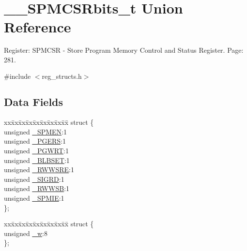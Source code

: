 \hypertarget{union_____s_p_m_c_s_rbits__t}{\section{\+\_\+\+\_\+\+S\+P\+M\+C\+S\+Rbits\+\_\+t Union Reference}
\label{union_____s_p_m_c_s_rbits__t}
}


Register\+: S\+P\+M\+C\+S\+R -\/ Store Program Memory Control and Status Register. Page\+: 281.  




{\ttfamily \#include $<$reg\+\_\+structs.\+h$>$}

\subsection*{Data Fields}
\begin{DoxyCompactItemize}
\item 
\begin{tabbing}
xx\=xx\=xx\=xx\=xx\=xx\=xx\=xx\=xx\=\kill
struct \{\\
\>unsigned \hyperlink{union_____s_p_m_c_s_rbits__t_a7334ff7a44cea22a3ccb71c298e6b1d6}{\_SPMEN}:1\\
\>unsigned \hyperlink{union_____s_p_m_c_s_rbits__t_a92df82c891fcf457fb690845fb436312}{\_PGERS}:1\\
\>unsigned \hyperlink{union_____s_p_m_c_s_rbits__t_ae78dee1df7d0afee1fb42984f0e99257}{\_PGWRT}:1\\
\>unsigned \hyperlink{union_____s_p_m_c_s_rbits__t_a2d508d88ac248656af65a48dc98dc84d}{\_BLBSET}:1\\
\>unsigned \hyperlink{union_____s_p_m_c_s_rbits__t_ab4a9d602876db9be9e6e7dcaebc279a2}{\_RWWSRE}:1\\
\>unsigned \hyperlink{union_____s_p_m_c_s_rbits__t_a41af35ec5da945ebabd68a3b0433a2c1}{\_SIGRD}:1\\
\>unsigned \hyperlink{union_____s_p_m_c_s_rbits__t_a67babcbf3b8656edc7224f97183d5429}{\_RWWSB}:1\\
\>unsigned \hyperlink{union_____s_p_m_c_s_rbits__t_a1a9a86babff2cf8c67f7b03a0fc62eba}{\_SPMIE}:1\\
\}; \\

\end{tabbing}\item 
\begin{tabbing}
xx\=xx\=xx\=xx\=xx\=xx\=xx\=xx\=xx\=\kill
struct \{\\
\>unsigned \hyperlink{union_____s_p_m_c_s_rbits__t_a07bf1fbc0f20f7171cb4b032563ae209}{\_w}:8\\
\}; \\

\end{tabbing}\end{DoxyCompactItemize}


